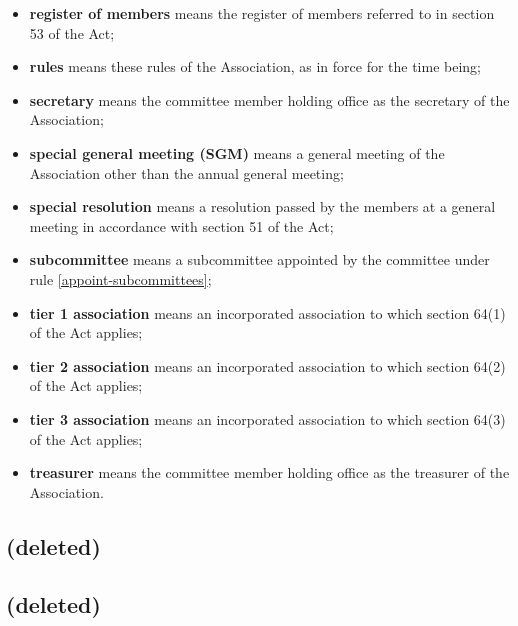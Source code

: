 \documentclass[../constitution.tex]{subfiles}
\begin{document}
\begin{itemize}[label={-}]
\item \textbf{register of members} means the register of members referred to in section 53 of the Act;
\item \textbf{rules} means these rules of the Association, as in force for the time being;
\item \textbf{secretary} means the committee member holding office as the secretary of the Association;
\item \textbf{special general meeting (SGM)} means a general meeting of the Association other than the annual general meeting;
\item \textbf{special resolution} means a resolution passed by the members at a general meeting in accordance with section 51 of the Act;
\item \textbf{subcommittee} means a subcommittee appointed by the committee under rule \ref{appoint-subcommittees};
\item \textbf{tier 1 association} means an incorporated association to which section 64(1) of the Act applies;
\item \textbf{tier 2 association} means an incorporated association to which section 64(2) of the Act applies;
\item \textbf{tier 3 association} means an incorporated association to which section 64(3) of the Act applies;
\item \textbf{treasurer} means the committee member holding office as the treasurer of the Association.
\end{itemize}


\subsection{(deleted)}


\subsection{(deleted)}

\end{document}
